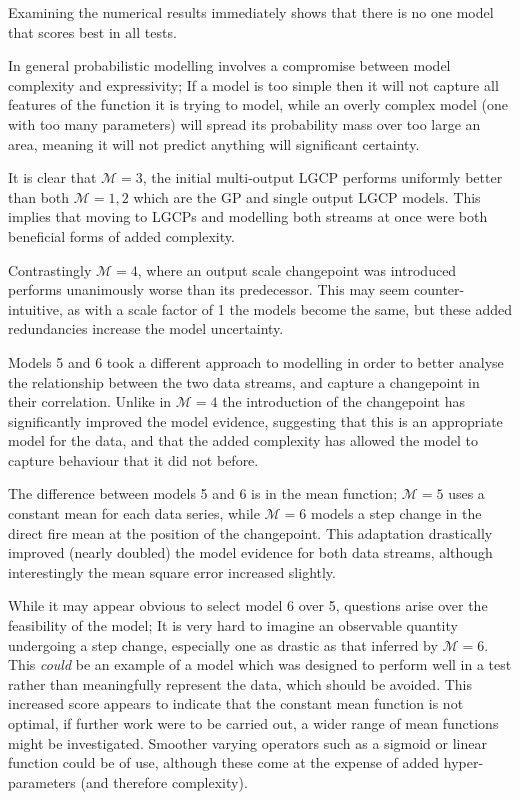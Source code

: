 \documentclass[a4paper,11pt]{report}
\begin{document}
Examining the numerical results immediately shows that there is no one model that scores best in all tests. \par

In general probabilistic modelling involves a compromise between model complexity and expressivity; If a model is too simple then it will not capture all features of the function it is trying to model, while an overly complex model (one with too many parameters) will spread its probability mass over too large an area, meaning it will not predict anything will significant certainty. \par

It is clear that \(\mathcal{M}=3\), the initial multi-output LGCP performs uniformly better than both \(\mathcal{M}=1,2\) which are the GP and single output LGCP models. This implies that moving to LGCPs and modelling both streams at once were both beneficial forms of added complexity. \par

Contrastingly \(\mathcal{M}=4\), where an output scale changepoint was introduced performs unanimously worse than its predecessor. This may seem counter-intuitive, as with a scale factor of 1 the models become the same, but these added redundancies increase the model uncertainty. \par

Models 5 and 6 took a different approach to modelling in order to better analyse the relationship between the two data streams, and capture a changepoint in their correlation. Unlike in \(\mathcal{M}=4\) the introduction of the changepoint has significantly improved the model evidence, suggesting that this is an appropriate model for the data, and that the added complexity has allowed the model to capture behaviour that it did not before. \par

The difference between models 5 and 6 is in the mean function; \(\mathcal{M}=5\) uses a constant mean for each data series, while \(\mathcal{M}=6\) models a step change in the direct fire mean at the position of the changepoint. This adaptation drastically improved (nearly doubled) the model evidence for both data streams, although interestingly the mean square error increased slightly. 

While it may appear obvious to select model 6 over 5, questions arise over the feasibility of the model; It is very hard to imagine an observable quantity undergoing a step change, especially one as drastic as that inferred by \(\mathcal{M}=6\). This \textit{could} be an example of a model which was designed to perform well in a test rather than meaningfully represent the data, which should be avoided. This increased score appears to indicate that the constant mean function is not optimal, if further work were to be carried out, a wider range of mean functions might be investigated. Smoother varying operators such as a sigmoid or linear function could be of use, although these come at the expense of added hyper-parameters (and therefore complexity). \par
\end{document}
